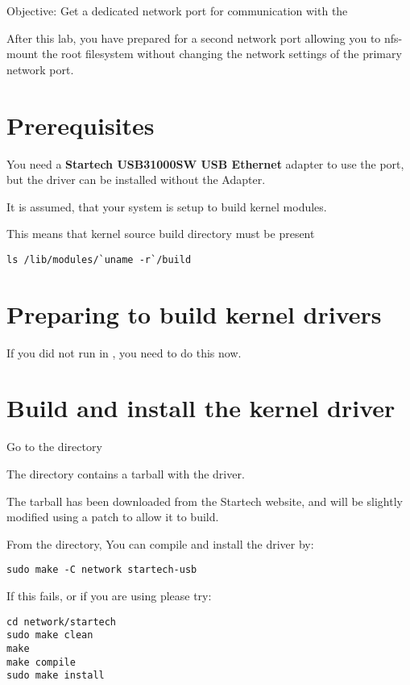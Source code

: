 {Objective: Get a dedicated network port for communication with the \devboard}

After this lab, you have prepared for a second network port allowing you to nfs-mount the \devboard
root filesystem without changing the network settings of the primary network port.

\section{Prerequisites}

You need a {\bf Startech USB31000SW USB Ethernet} adapter to use the port, but the driver
can be installed without the Adapter.

It is assumed, that your system is setup to build kernel modules.

This means that kernel source build directory must be present

\begin{verbatim}
ls /lib/modules/`uname -r`/build
\end{verbatim}

\section{Preparing to build kernel drivers}

If you did not run  in \labdir, you need to do this now.

\section{Build and install the kernel driver}

Go to the \labdir directory 

The  directory contains a tarball with the driver.

The tarball has been downloaded from the Startech website, and will be slightly
modified using a patch to allow it to build.

From the \labdir directory, You can compile and install the driver by:

\begin{verbatim}
sudo make -C network startech-usb
\end{verbatim}

If this fails, or if you are using  please try: 
\begin{verbatim}
cd network/startech
sudo make clean
make
make compile
sudo make install
\end{verbatim}
